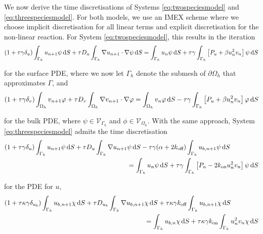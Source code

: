 We now derive the time discretisations of Systems \eqref{eq:twospeciesmodel} and \eqref{eq:threespeciesmodel}. For both models, we use an IMEX scheme where we choose implicit discretisation for all linear terms and explicit discretisation for the non-linear reaction. For System \eqref{eq:twospeciesmodel}, this results in the iteration
%
\begin{equation}\label{eq:2s_weak_form_surface}
    (1 + \tau \gamma \delta_u) \int_{\Gamma_h} u_{n + 1} \psi \mathop{}\!\mathrm{d} S + \tau D_u \int_{\Gamma_h} \nabla u_{n + 1} \cdot \nabla \psi \mathop{}\!\mathrm{d} S = \int_{\Gamma_h} u_n \psi \mathop{}\!\mathrm{d} S + \tau \gamma \int_{\Gamma_h} \left[ P_u + \beta u_n^2 v_n \right] \psi \mathop{}\!\mathrm{d} S
\end{equation}

\noindent
for the surface PDE, where we now let $\Gamma_h$ denote the submesh of $\partial \Omega_h$ that approximates $\Gamma$, and
%
\begin{equation}\label{eq:2s_weak_form_bulk}
    (1 + \tau \gamma \delta_v) \int_{\Omega_h} v_{n + 1} \varphi + \tau D_v \int_{\Omega_h} \nabla v_{n + 1} \cdot \nabla \varphi = \int_{\Omega_h} v_n \varphi \mathop{}\!\mathrm{d} S - \tau \gamma \int_{\Gamma_h} \left[ P_u + \beta u_n^2 v_n \right] \varphi \mathop{}\!\mathrm{d} S
\end{equation}

\noindent
for the bulk PDE, where $\psi \in \mathcal{V}_{\Gamma_h}$ and $\phi \in \mathcal{V}_{\Omega_h}$. With the same approach, System \eqref{eq:threespeciesmodel} admits the time discretisation
%
\begin{equation}\label{eq:3s_u}
    \begin{aligned}
        (1 + \tau \gamma \delta_u) \int_{\Gamma_h} u_{n + 1} \psi \mathop{}\!\mathrm{d} S + \tau D_u \int_{\Gamma_h} \nabla u_{n + 1} &\psi \mathop{}\!\mathrm{d} S - \tau \gamma (\alpha + 2 k_\text{off}) \int_{\Gamma_h} u_{b, n + 1} \psi \mathop{}\!\mathrm{d} S \\
        &= \int_{\Gamma_h} u_n \psi \mathop{}\!\mathrm{d} S + \tau \gamma \int_{\Gamma_h} \left[ P_u - 2 k_\text{on} u_n^2 v_n \right] \psi \mathop{}\!\mathrm{d} S
    \end{aligned}
\end{equation}

\noindent
for the PDE for $u$,
%
\begin{equation}\label{eq:3s_ub}
    \begin{aligned}
        (1 + \tau \kappa \gamma \delta_{u_b}) \int_{\Gamma_h} u_{b, n + 1} \chi \mathop{}\!\mathrm{d} S + \tau D_{u_b} \int_{\Gamma_h} \nabla u_{b, n + 1} &\chi \mathop{}\!\mathrm{d} S + \tau \kappa \gamma k_\text{off} \int_{\Gamma_h} u_{b, n + 1} \chi \mathop{}\!\mathrm{d} S \\
        &= \int_{\Gamma_h} u_{b,n} \chi \mathop{}\!\mathrm{d} S + \tau \kappa \gamma k_\text{on} \int_{\Gamma_h} u_n^2 v_n \chi \mathop{}\!\mathrm{d} S
    \end{aligned}
\end{equation}

